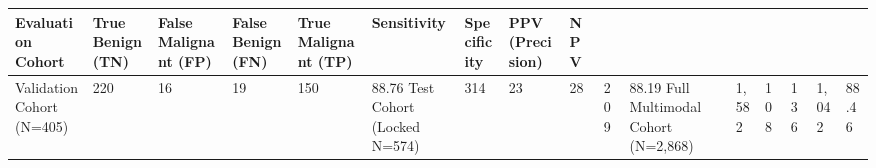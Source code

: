 \begin{tabular}{lllllllll}
\toprule
Evaluation Cohort & True Benign (TN) & False Malignant (FP) & False Benign (FN) & True Malignant (TP) & Sensitivity & Specificity & PPV (Precision) & NPV \\
\midrule
Validation Cohort (N=405) & 220 & 16 & 19 & 150 & 88.76%
Test Cohort (Locked N=574) & 314 & 23 & 28 & 209 & 88.19%
Full Multimodal Cohort (N=2,868) & 1,582 & 108 & 136 & 1,042 & 88.46%
\bottomrule
\end{tabular}
